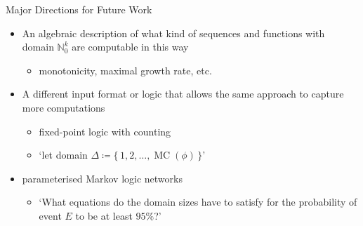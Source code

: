 \documentclass{beamer}
\DeclareMathOperator{\MC}{MC}
\begin{document}
\begin{frame}{Major Directions for Future Work}
  \begin{itemize}
    \item An algebraic description of what kind of sequences and functions with
          domain $\mathbb{N}_{0}^{k}$ are computable in this way
          \begin{itemize}
            \item monotonicity, maximal growth rate, etc.
          \end{itemize}
    \item A different input format or logic that allows the same approach to
          capture more computations
          \begin{itemize}
            \item fixed-point logic with counting
            \item `let domain $\Delta \coloneqq \{\, 1, 2, \dots, \MC(\phi) \,\}$'
          \end{itemize}
    \item parameterised Markov logic networks
    \begin{itemize}
      \item `What equations do the domain sizes have to satisfy for the
            probability of event $E$ to be at least $95\%$?'
    \end{itemize}
  \end{itemize}
\end{frame}
\end{document}
